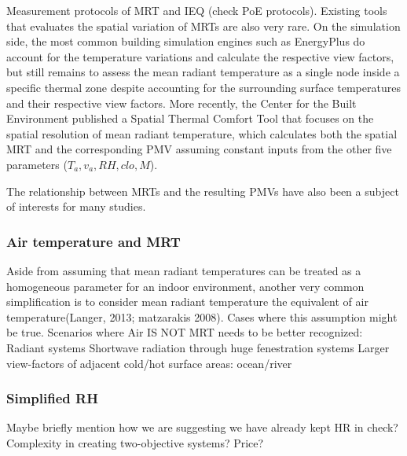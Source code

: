     Measurement protocols of MRT and IEQ (check PoE protocols).
    Existing tools that evaluates the spatial variation of MRTs are also very rare. On the simulation side, the most common building simulation engines such as EnergyPlus \cite{energyplus_engineering_2013} do account for the temperature variations and calculate the respective view factors, but still remains to assess the mean radiant temperature as a single node inside a specific thermal zone despite accounting for the surrounding surface temperatures and their respective view factors. More recently, the Center for the Built Environment published a Spatial Thermal Comfort Tool \cite{arens_modeling_2015} that focuses on the spatial resolution of mean radiant temperature, which calculates both the spatial MRT and the corresponding PMV assuming constant inputs from the other five parameters ($T_a, v_a, RH, clo, M$).  
        
    The relationship between MRTs and the resulting PMVs have also been a subject of interests for many studies. 
\subsubsection{Air temperature and MRT}
        Aside from assuming that mean radiant temperatures can be treated as a homogeneous parameter for an indoor environment, another very common simplification is to consider mean radiant temperature the equivalent of air temperature\cite{kantor_most_2011}(Langer, 2013; matzarakis 2008). 
                Cases where this assumption might be true.
            Scenarios where Air IS NOT MRT needs to be better recognized:
            Radiant systems
            Shortwave radiation through huge fenestration systems
            Larger view-factors of adjacent cold/hot surface areas: ocean/river
\subsubsection{Simplified RH}
        Maybe briefly mention how we are suggesting we have already kept HR in check?
        Complexity in creating two-objective systems? Price?

